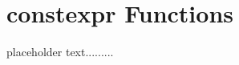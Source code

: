 \newpage
\section[{\ttfamily constexpr} Functions]{{\SecCode constexpr} Functions}\label{constexprfunc}


placeholder text.........


